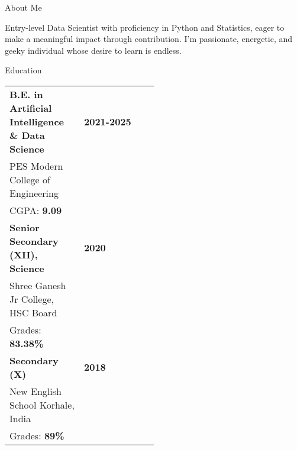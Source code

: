 \documentclass{resume} %
\begin{document}



\vspace{-7mm}
\hrulefill
\vspace{2mm}



\begin{rSection}{About Me }

{Entry-level Data Scientist with proficiency in Python and Statistics, eager to make a meaningful impact through contribution. I'm passionate, energetic, and geeky individual whose desire to learn is endless. }


\end{rSection}

\begin{rSection}{Education}

\begin{tabular}{@{} l >{\raggedleft\arraybackslash}p{0.5\linewidth}@{}}
\textbf{B.E. in Artificial Intelligence \& Data Science} & \textbf{2021-2025} \\
PES Modern College of Engineering & \\
CGPA: \textbf{9.09}& \\[6pt]

\textbf{Senior Secondary (XII), Science} & \textbf{2020}\\
Shree Ganesh Jr College, HSC Board & \\
Grades: \textbf{83.38\%} & \\[6pt]

\textbf{Secondary (X)} & \textbf{2018} \\
New English School Korhale, India & \\
Grades: \textbf{89\%} & \\
\end{tabular}

\end{rSection}
\end{document}
